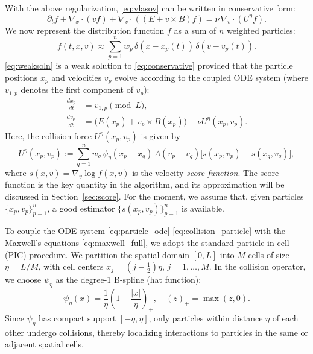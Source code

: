 \documentclass[]{article}
\numberwithin{equation}{section}
\begin{document}
With the above regularization, \eqref{eq:vlasov} can be written in conservative form:
\begin{equation}
\label{eq:conservative}
\partial_t f + \nabla_x \cdot (v f) + \nabla_v \cdot ((E + v \times B) f) = \nu \, \nabla_v \cdot (U^\eta f).
\end{equation}
We now represent the distribution function $f$ as a sum of $n$ weighted particles:
\begin{equation}
\label{eq:weaksoln}
f(t, x, v) \approx \sum_{p=1}^{n} w_p \, \delta(x - x_p(t)) \, \delta(v - v_p(t)).
\end{equation}
\eqref{eq:weaksoln} is a weak solution to \eqref{eq:conservative} provided that 
the particle positions $x_p$ and velocities $v_p$ evolve according to the coupled ODE system (where $v_{1,p}$ denotes the first component of $v_p$):
\begin{align}
\label{eq:particle_ode}
\frac{dx_p}{dt} &= v_{1,p} \pmod{L}, \\
\label{eq:collision_particle}
\frac{dv_p}{dt} &= \big(E(x_p) + v_p \times B(x_p)\big) - \nu U^{\eta}(x_p,v_p).
\end{align}
Here, the collision force $U^{\eta}(x_p,v_p)$ is given by
\begin{equation}
\label{eq:Landau_particle}
U^{\eta}(x_p,v_p):=\sum_{q=1}^{n} w_q \, \psi_\eta(x_p - x_q) \, A(v_p - v_q) \big[ s(x_p, v_p) - s(x_q, v_q) \big],
\end{equation}
where $s(x,v) = \nabla_v \log f(x,v)$ is the velocity \emph{score function}. The score function is the key quantity in the algorithm, and its approximation will be discussed in Section~\ref{sec:score}. For the moment, we assume that, given particles $\{x_p,v_p\}_{p=1}^n$, a good estimator $\{s(x_p,v_p)\}_{p=1}^n$ is available.

To couple the ODE system \eqref{eq:particle_ode}-\eqref{eq:collision_particle} with the Maxwell's equations \eqref{eq:maxwell_full}, we adopt the standard particle-in-cell (PIC) procedure. We partition the spatial domain $[0,L]$ into $M$ cells of size $\eta=L/M$, with cell centers $x_j = (j - \tfrac{1}{2})\eta$, $j = 1, \ldots, M$. In the collision operator, we choose $\psi_\eta$ as the degree-1 B-spline (hat function):
\begin{equation}
\label{eq:hat_kernel}
\psi_\eta(x) = \frac{1}{\eta}\!\left(1 - \frac{|x|}{\eta}\right)_{\!\!+}\!, \quad (z)_+ = \max(z, 0).
\end{equation}
Since $\psi_\eta$ has compact support $[-\eta, \eta]$, only particles within distance $\eta$ of each other undergo collisions, thereby localizing interactions to particles in the same or adjacent spatial cells.  %
\end{document}

